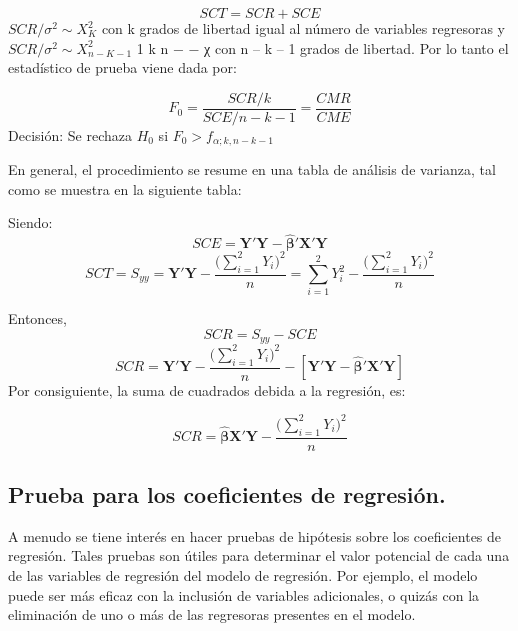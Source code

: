 \documentclass[
]{book}
\begin{document}
\[
\begin{equation}
SCT=SCR+SCE
\label{eq:identidad-total} 
\end{equation}
\] \(SCR/\sigma^{2} \sim X_{K}^2\) con k grados de libertad igual al número de variables regresoras y \(SCR/\sigma^{2} \sim X_{n-K-1}^2\) 1 k n − − χ con n -- k -- 1 grados de libertad. Por lo tanto el estadístico de prueba viene dada por:

\[
\begin{equation}
F_{0}= \frac{SCR/k}{SCE/n-k-1}=\frac{CMR}{CME}
\label{eq:estadistico-F}
\end{equation}
\] Decisión: Se rechaza \(H_{0}\) si \(F_{0}>f_{\alpha;k,n-k-1}\)

En general, el procedimiento se resume en una tabla de análisis de varianza, tal como se muestra en la siguiente tabla:

Siendo: \[
\begin{equation}
SCE = \boldsymbol{Y'Y - \hat{\beta}'X'Y}
\label{eq:sce-formula}
\end{equation}
\] \[
\begin{equation}
SCT=S_{yy}= \boldsymbol{Y'Y}-\frac{\bigg(\sum_{i=1}^{2}Y_{i}\bigg)^{2}}{n} = \sum_{i=1}^{2}Y_{i}^{2}- \frac{\bigg(\sum_{i=1}^{2}Y_{i}\bigg)^{2}}{n}
\end{equation}
\]

Entonces,
\[
\begin{equation}
SCR=S_{yy}-SCE
\label{eq:scr-formula}
\end{equation}
\]
\[
\begin{equation}
SCR= \boldsymbol{Y'Y}-\frac{\bigg(\sum_{i=1}^{2}Y_{i}\bigg)^{2}}{n}-[\boldsymbol{Y'Y-\hat{\beta}'X'Y}]
\end{equation}
\]
Por consiguiente, la suma de cuadrados debida a la regresión, es:

\[
\begin{equation}
SCR= \boldsymbol{\hat{\beta}X'Y}-\frac{\bigg(\sum_{i=1}^{2}Y_{i}\bigg)^{2}}{n}
\end{equation}
\]

\hypertarget{prueba-para-los-coeficientes-de-regresiuxf3n.}{%
\subsection{Prueba para los coeficientes de regresión.}\label{prueba-para-los-coeficientes-de-regresiuxf3n.}}

A menudo se tiene interés en hacer pruebas de hipótesis sobre los coeficientes de regresión. Tales pruebas son útiles para determinar el valor potencial de cada una de las variables de regresión del modelo de regresión. Por ejemplo, el modelo puede ser más eficaz con la inclusión de variables adicionales, o quizás con la eliminación de uno o más de las regresoras presentes en el modelo.
\end{document}
